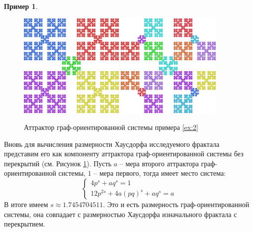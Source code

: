 \documentclass[a4paper,14pt]{extarticle} %
\newcommand{\0}{\varnothing}
\newcommand{\8}{\infty}
\theoremstyle{definition}
\newtheorem{example}{Пример}
\begin{document}
\begin{example}
\begin{figure}[H]
    \centering
    \includegraphics[width=0.45\textwidth]{1_1_1.png}
    \hfill
    \includegraphics[width=0.45\textwidth]{1_1_2.png}
    \caption{Аттрактор граф-ориентированной системы примера \ref{ex:2}}
    \label{fig:primer2}
\end{figure}

Вновь для вычисления размерности Хаусдорфа исследуемого фрактала представим его как компоненту аттрактора граф-ориентированной системы без перекрытий (см. Рисунок \ref{fig:primer2}).
Пусть $a$ -- мера второго аттрактора граф-ориентированной системы, $1$ -- мера первого, тогда имеет место система:
$$
\begin{cases}
   4p^s + aq^s = 1\\
   12p^{2s} + 4a(pq)^{s} +aq^s  = a
\end{cases}
$$
В итоге имеем $s\approx1.7454704511$. Это и есть размерность граф-ори\-ен\-ти\-ро\-ван\-ной системы, она совпадает с размерностью Хаусдорфа изначального фрактала с перекрытием.


\end{example}
\end{document}
